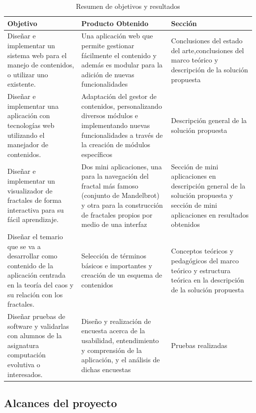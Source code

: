 \documentclass[letterpaper, 11pt, oneside]{article}
\theoremstyle{definition}
\theoremstyle{remark}
\begin{document}
\begin{table}[htb]
\centering
\begin{tabular}{ p{4.5cm} | p{5cm} | p{4.5cm} }
\toprule
\rowcolor[gray]{0.9}Objetivo & Producto Obtenido & Sección \\
\midrule
 Diseñar e implementar un sistema web para el manejo de contenidos, o utilizar uno existente. & Una aplicación web que permite gestionar fácilmente el contenido y además es modular para la adición de nuevas funcionalidades & Conclusiones del estado del arte,conclusiones del marco teórico y descripción de la solución propuesta \\
\midrule
 Diseñar e implementar una aplicación con tecnologías web utilizando el manejador de contenidos. & Adaptación del gestor de contenidos, personalizando diversos módulos e implementando nuevas funcionalidades a través de la creación de módulos específicos  & Descripción general de la solución propuesta \\
\midrule
 Diseñar e implementar un visualizador de fractales de forma interactiva para su fácil aprendizaje. & Dos mini aplicaciones, una para la navegación del fractal más famoso (conjunto de Mandelbrot) y otra para la construcción de fractales propios por medio de una interfaz & Sección de mini aplicaciones en descripción general de la solución propuesta y sección de mini aplicaciones en resultados obtenidos \\
\midrule
 Diseñar el temario que se va a desarrollar como contenido de la aplicación centrada en la teoría del caos y su relación con los fractales. & Selección de términos básicos e importantes y creación de un esquema de contenidos & Conceptos teóricos y pedagógicos del marco teórico y estructura teórica en la descripción de la solución propuesta\\
\midrule
 Diseñar pruebas de software y validarlas con alumnos de la asignatura computación evolutiva o interesados. & Diseño y realización de encuesta acerca de la usabilidad, entendimiento y comprensión de la aplicación, y el análisis de dichas encuestas & Pruebas realizadas \\
\bottomrule
\end{tabular}
\caption{Resumen de objetivos y resultados}
\label{tb:Xname}
\end{table}

\clearpage
\subsection{Alcances del proyecto}
\end{document}
